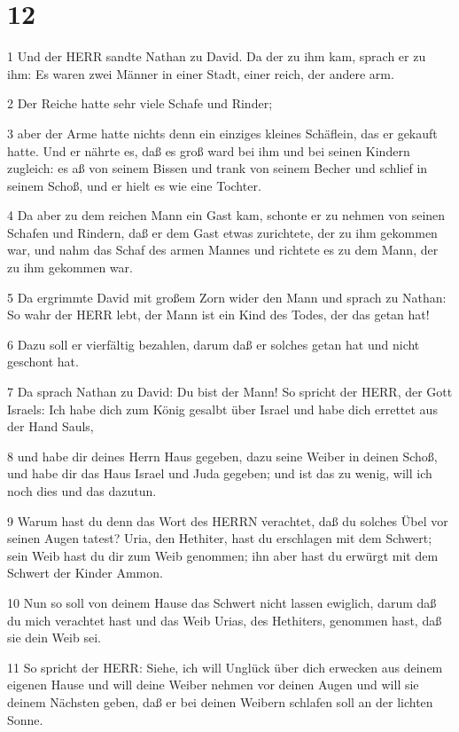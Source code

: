 \chapter{12}

\par 1 Und der HERR sandte Nathan zu David. Da der zu ihm kam, sprach er zu ihm: Es waren zwei Männer in einer Stadt, einer reich, der andere arm.
\par 2 Der Reiche hatte sehr viele Schafe und Rinder;
\par 3 aber der Arme hatte nichts denn ein einziges kleines Schäflein, das er gekauft hatte. Und er nährte es, daß es groß ward bei ihm und bei seinen Kindern zugleich: es aß von seinem Bissen und trank von seinem Becher und schlief in seinem Schoß, und er hielt es wie eine Tochter.
\par 4 Da aber zu dem reichen Mann ein Gast kam, schonte er zu nehmen von seinen Schafen und Rindern, daß er dem Gast etwas zurichtete, der zu ihm gekommen war, und nahm das Schaf des armen Mannes und richtete es zu dem Mann, der zu ihm gekommen war.
\par 5 Da ergrimmte David mit großem Zorn wider den Mann und sprach zu Nathan: So wahr der HERR lebt, der Mann ist ein Kind des Todes, der das getan hat!
\par 6 Dazu soll er vierfältig bezahlen, darum daß er solches getan hat und nicht geschont hat.
\par 7 Da sprach Nathan zu David: Du bist der Mann! So spricht der HERR, der Gott Israels: Ich habe dich zum König gesalbt über Israel und habe dich errettet aus der Hand Sauls,
\par 8 und habe dir deines Herrn Haus gegeben, dazu seine Weiber in deinen Schoß, und habe dir das Haus Israel und Juda gegeben; und ist das zu wenig, will ich noch dies und das dazutun.
\par 9 Warum hast du denn das Wort des HERRN verachtet, daß du solches Übel vor seinen Augen tatest? Uria, den Hethiter, hast du erschlagen mit dem Schwert; sein Weib hast du dir zum Weib genommen; ihn aber hast du erwürgt mit dem Schwert der Kinder Ammon.
\par 10 Nun so soll von deinem Hause das Schwert nicht lassen ewiglich, darum daß du mich verachtet hast und das Weib Urias, des Hethiters, genommen hast, daß sie dein Weib sei.
\par 11 So spricht der HERR: Siehe, ich will Unglück über dich erwecken aus deinem eigenen Hause und will deine Weiber nehmen vor deinen Augen und will sie deinem Nächsten geben, daß er bei deinen Weibern schlafen soll an der lichten Sonne.
